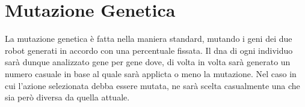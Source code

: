 \section{Mutazione Genetica}
La mutazione genetica è fatta nella maniera standard, mutando i geni dei due
robot generati in accordo con una percentuale fissata.\newline
Il dna di ogni individuo sarà dunque analizzato gene per gene dove, di volta in
volta sarà generato un numero casuale in base al quale sarà applicta o meno la
mutazione. Nel caso in cui l'azione selezionata debba essere mutata, ne sarà
scelta casualmente una che sia però diversa da quella attuale.
